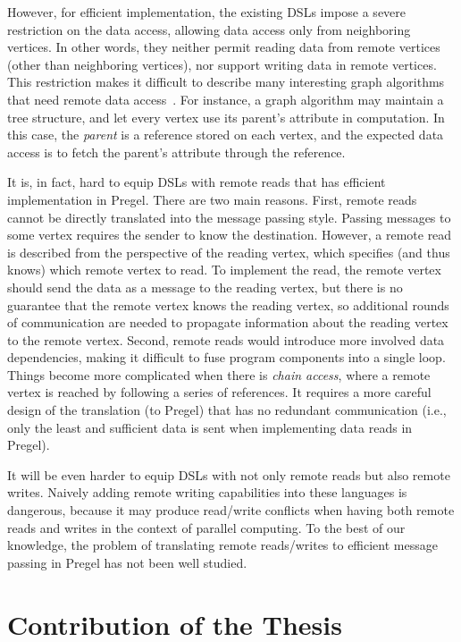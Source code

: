 \documentclass{sokendai_thesis} %
\begin{document}
However, for efficient implementation, the existing DSLs impose a severe restriction on the data access, allowing data access only from neighboring vertices.
In other words, they neither permit reading data from remote vertices (other than neighboring vertices), nor support writing data in remote vertices.
This restriction makes it difficult to describe many interesting graph algorithms that need remote data access~\cite{optimizing,connectivity}.
For instance, a graph algorithm may maintain a tree structure, and let every vertex use its parent's attribute in computation.
In this case, the \textit{parent} is a reference stored on each vertex, and the expected data access is to fetch the parent's attribute through the reference.

It is, in fact, hard to equip DSLs with remote reads that has efficient implementation in Pregel.
There are two main reasons.
First, remote reads cannot be directly translated into the message passing style.
Passing messages to some vertex requires the sender to know the destination.
However, a remote read is described from the perspective of the reading vertex, which specifies (and thus knows) which remote vertex to read.
To implement the read, the remote vertex should send the data as a message to the reading vertex, but there is no guarantee that the remote vertex knows the reading vertex, so additional rounds of communication are needed to propagate information about the reading vertex to the remote vertex.
Second, remote reads would introduce more involved data dependencies, making it difficult to fuse program components into a single loop.
Things become more complicated when there is \emph{chain access}, where a remote vertex is reached by following a series of references.
It requires a more careful design of the translation (to Pregel) that has no redundant communication (i.e., only the least and sufficient data is sent when implementing data reads in Pregel).

It will be even harder to equip DSLs with not only remote reads but also remote writes.
Naively adding remote writing capabilities into these languages is dangerous, because it may produce read/write conflicts when having both remote reads and writes in the context of parallel computing.
To the best of our knowledge, the problem of translating remote reads/writes to efficient message passing in Pregel has not been well studied.  

\section{Contribution of the Thesis}
\end{document}
